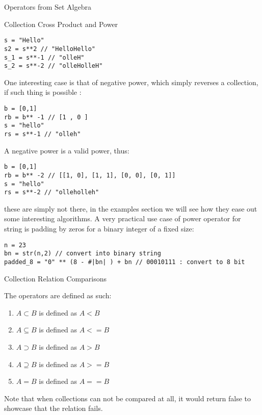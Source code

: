\begin{section}{Operators from Set Algebra}
\begin{subsection}{Collection Cross Product and Power}
\begin{lstlisting}[style=JexlStyle]
s = "Hello"
s2 = s**2 // "HelloHello"
s_1 = s**-1 // "olleH"
s_2 = s**-2 // "olleHolleH"
\end{lstlisting}

One interesting case is that of negative power, which simply reverses a collection, 
if such thing is possible : 

\begin{lstlisting}[style=JexlStyle]
b = [0,1]
rb = b** -1 // [1 , 0 ]
s = "hello" 
rs = s**-1 // "olleh" 
\end{lstlisting}

A negative power is a valid power, thus:

\begin{lstlisting}[style=JexlStyle]
b = [0,1]
rb = b** -2 // [[1, 0], [1, 1], [0, 0], [0, 1]]
s = "hello" 
rs = s**-2 // "olleholleh" 
\end{lstlisting}

these are simply not there, in the examples section
we will see how they ease out some interesting algorithms.
A very practical use case of power operator for string
is padding by zeros for a binary integer of a fixed size:

\begin{lstlisting}[style=JexlStyle]
n = 23
bn = str(n,2) // convert into binary string
padded_8 = "0" ** (8 - #|bn| ) + bn // 00010111 : convert to 8 bit 
\end{lstlisting}

\end{subsection}

\begin{subsection}{Collection Relation Comparisons}

The operators are defined as such:
\begin{enumerate}
\item{ $A \subset B $ is defined as $A < B $  }
\item{ $A \subseteq B $ is defined as $A <= B $  }
\item{ $A \supset B $ is defined as $A > B $  }
\item{ $A \supseteq B $ is defined as $A >= B $  }
\item{ $A = B$ is defined as $A == B$  }
\end{enumerate}

Note that when collections can not be compared at all, 
it would return false to showcase that the relation fails.


\end{subsection}
\end{section}
